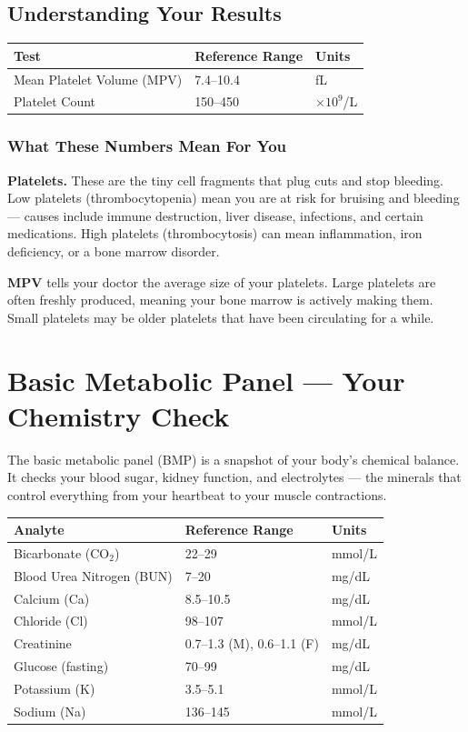 \subsection{Understanding Your Results}

\begin{longtable}{@{}lll@{}}
\toprule
\textbf{Test} & \textbf{Reference Range} & \textbf{Units} \\
\midrule
Mean Platelet Volume (MPV) & 7.4--10.4 & fL \\
Platelet Count & 150--450 & $\times 10^9$/L \\
\bottomrule
\end{longtable}

\subsubsection{What These Numbers Mean For You}

\textbf{Platelets.} These are the tiny cell fragments that plug cuts and stop bleeding. Low platelets (thrombocytopenia) mean you are at risk for bruising and bleeding --- causes include immune destruction, liver disease, infections, and certain medications. High platelets (thrombocytosis) can mean inflammation, iron deficiency, or a bone marrow disorder.

\textbf{MPV} tells your doctor the average size of your platelets. Large platelets are often freshly produced, meaning your bone marrow is actively making them. Small platelets may be older platelets that have been circulating for a while.

\clearpage
\section{Basic Metabolic Panel --- Your Chemistry Check}

The basic metabolic panel (BMP) is a snapshot of your body's chemical balance. It checks your blood sugar, kidney function, and electrolytes --- the minerals that control everything from your heartbeat to your muscle contractions.

\begin{longtable}{@{}lll@{}}
\toprule
\textbf{Analyte} & \textbf{Reference Range} & \textbf{Units} \\
\midrule
Bicarbonate (CO$_2$) & 22--29 & mmol/L \\
Blood Urea Nitrogen (BUN) & 7--20 & mg/dL \\
Calcium (Ca) & 8.5--10.5 & mg/dL \\
Chloride (Cl) & 98--107 & mmol/L \\
Creatinine & 0.7--1.3 (M), 0.6--1.1 (F) & mg/dL \\
Glucose (fasting) & 70--99 & mg/dL \\
Potassium (K) & 3.5--5.1 & mmol/L \\
Sodium (Na) & 136--145 & mmol/L \\
\bottomrule
\end{longtable}

